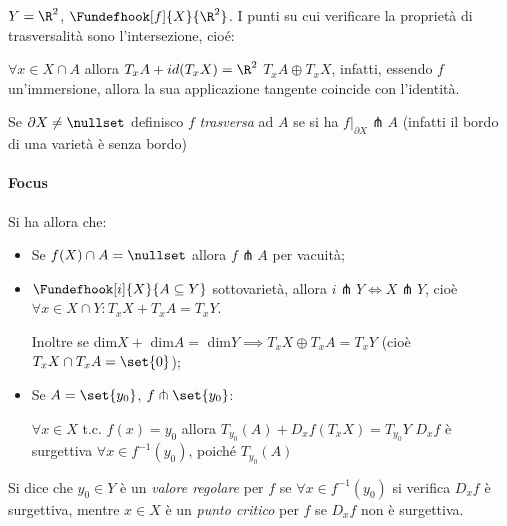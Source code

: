 \begin{es}
$Y = \R^2$, $\Fundefhook[f]{X}{\R^2}$. I punti su cui verificare la proprietà di trasversalità sono l'intersezione, cioé:

$\forall x \in X \cap A$ allora $T_xA + id(T_xX) = \R^2$ \iff $T_xA \oplus T_xX$, infatti, essendo $f$ un'immersione, allora la sua applicazione tangente coincide con l'identità.
\end{es}

\begin{defn}
Se $\partial X \neq \nullset$ definisco $f$ \emph{trasversa} ad $A$ se si ha $f|_{\partial X} \pitchfork A$ (infatti il bordo di una varietà è senza bordo)
\end{defn}

\paragraph{Focus}
Si ha allora che:
\begin{itemize}
\item Se $f(X) \cap A = \nullset$ allora $f \pitchfork A$ per vacuità;
\item $\Fundefhook[i]{X}{A \subseteq Y}$ sottovarietà, allora $i \pitchfork Y \iff X \pitchfork Y$, cioè $\forall x \in X\cap Y: T_xX + T_xA = T_xY$.

Inoltre se dim$X +$ dim$A =$ dim$Y \implies T_xX \oplus T_xA = T_xY$ (cioè $T_xX \cap T_xA = \set{0}$);
\item Se $A = \set{y_0}$, $f \pitchfork \set{y_0}$:

$\forall x \in X$ t.c. $f(x) = y_0$ allora $T_{y_0}(A) + D_xf(T_xX) = T_{y_0}Y$ \iff $D_xf$ è surgettiva $\forall x \in f^{-1}(y_0)$, poiché $T_{y_0}(A)$
\end{itemize}

\begin{defn}
Si dice che $y_0 \in Y$ è un \emph{valore regolare} per $f$ se $\forall x \in f^{-1}(y_0)$ si verifica $D_xf$ è surgettiva, mentre $x \in X$ è un \emph{punto critico} per $f$ se $D_xf$ non è surgettiva.
\end{defn}
